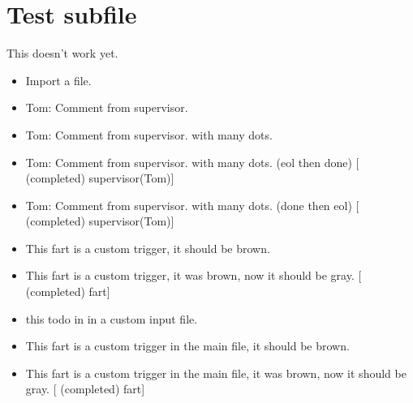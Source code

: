 \chapter{Test subfile}
\label{autosec:12}
This doesn't work yet.
    \begin{itemize}[noitemsep]
        \item {\color{red}Import a file.}
        \item {\color{WildStrawberry}Tom: Comment from supervisor.}
        \item {\color{WildStrawberry}Tom: Comment from supervisor. with many dots.}
        \item {\color{Gray}Tom: Comment from supervisor. with many dots. (eol then done) [ (completed) supervisor(Tom)]}
        \item {\color{Gray}Tom: Comment from supervisor. with many dots. (done then eol) [ (completed) supervisor(Tom)]}
    \end{itemize}
\label{autosec:13}
    \begin{itemize}[noitemsep]
        \item {\color{brown}This fart is a custom trigger, it should be brown.}
        \item {\color{Gray}This fart is a custom trigger, it was brown, now it should be gray. [ (completed) fart]}
        \item {\color{red}this todo in in a custom input file.}
    \end{itemize}
\label{autosec:13}
    \begin{itemize}[noitemsep]
        \item {\color{brown}This fart is a custom trigger in the main file, it should be brown.}
        \item {\color{Gray}This fart is a custom trigger in the main file, it was brown, now it should be gray. [ (completed) fart]}
    \end{itemize}


